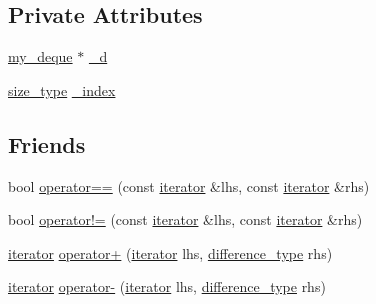 \subsection*{Private Attributes}
\begin{DoxyCompactItemize}
\item 
\hyperlink{classmy__deque}{my\-\_\-deque} $\ast$ \hyperlink{classmy__deque_1_1iterator_a69df69b162f6a0fb1f6e59bdccb639c4}{\-\_\-d}
\item 
\hyperlink{classmy__deque_a61e5e5317fe72a381ce4d45f09544b02}{size\-\_\-type} \hyperlink{classmy__deque_1_1iterator_a41f01f39f26a404b45742e43c3352917}{\-\_\-index}
\end{DoxyCompactItemize}
\subsection*{Friends}
\begin{DoxyCompactItemize}
\item 
bool \hyperlink{classmy__deque_1_1iterator_a27d0df37bd079bf4e62faa0b468b060c}{operator==} (const \hyperlink{classmy__deque_1_1iterator}{iterator} \&lhs, const \hyperlink{classmy__deque_1_1iterator}{iterator} \&rhs)
\item 
bool \hyperlink{classmy__deque_1_1iterator_aad2b3926ed1e2db6f22ca3117766181b}{operator!=} (const \hyperlink{classmy__deque_1_1iterator}{iterator} \&lhs, const \hyperlink{classmy__deque_1_1iterator}{iterator} \&rhs)
\item 
\hyperlink{classmy__deque_1_1iterator}{iterator} \hyperlink{classmy__deque_1_1iterator_aaf128f38c16b5a8284f51a9c69f6fd77}{operator+} (\hyperlink{classmy__deque_1_1iterator}{iterator} lhs, \hyperlink{classmy__deque_1_1iterator_ac5f62e8566ad92478931c2abd9ac6596}{difference\-\_\-type} rhs)
\item 
\hyperlink{classmy__deque_1_1iterator}{iterator} \hyperlink{classmy__deque_1_1iterator_ab8892736ecb2ffe5f6b9ac9b9dbb60c0}{operator-\/} (\hyperlink{classmy__deque_1_1iterator}{iterator} lhs, \hyperlink{classmy__deque_1_1iterator_ac5f62e8566ad92478931c2abd9ac6596}{difference\-\_\-type} rhs)
\end{DoxyCompactItemize}


